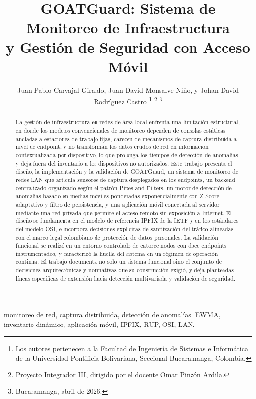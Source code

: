 \documentclass[journal]{IEEEtran}
\title{GOATGuard: Sistema de Monitoreo de Infraestructura \\
       y Gestión de Seguridad con Acceso Móvil}
\author{Juan Pablo Carvajal Giraldo,
        Juan David Monsalve Niño,
        y Johan David Rodríguez Castro
\thanks{Los autores pertenecen a la Facultad de Ingeniería de Sistemas 
e Informática de la Universidad Pontificia Bolivariana, Seccional 
Bucaramanga, Colombia.}
\thanks{Proyecto Integrador III, dirigido por el docente Omar Pinzón Ardila.}
\thanks{Bucaramanga, abril de 2026.}}
\begin{document}
\maketitle

\begin{abstract}
La gestión de infraestructura en redes de área local enfrenta una 
limitación estructural, en donde los modelos convencionales de monitoreo 
dependen de consolas estáticas ancladas a estaciones de trabajo 
fijas, carecen de mecanismos de captura distribuida a nivel de 
endpoint, y no transforman los datos crudos de red en información 
contextualizada por dispositivo, lo que prolonga los tiempos de 
detección de anomalías y deja fuera del inventario a los 
dispositivos no autorizados. Este trabajo presenta el diseño, la 
implementación y la validación de GOATGuard, un sistema de 
monitoreo de redes LAN que articula sensores de captura 
desplegados en los endpoints, un backend centralizado organizado 
según el patrón Pipes and Filters, un motor de detección de 
anomalías basado en medias móviles ponderadas exponencialmente con 
Z-Score adaptativo y filtro de persistencia, y una aplicación 
móvil conectada al servidor mediante una red privada que permite 
el acceso remoto sin exposición a Internet. El diseño se fundamenta 
en el modelo de referencia IPFIX de la IETF y en los estándares del 
modelo OSI, e incorpora decisiones explícitas de sanitización del 
tráfico alineadas con el marco legal colombiano de protección de 
datos personales. La validación funcional se realizó en un entorno 
controlado de catorce nodos con doce endpoints instrumentados, y 
caracterizó la huella del sistema en un régimen de operación 
continua. El trabajo documenta no solo un sistema funcional sino el 
conjunto de decisiones arquitectónicas y normativas que su 
construcción exigió, y deja planteadas líneas específicas de 
extensión hacia detección multivariada y validación de seguridad.
\end{abstract}


\begin{IEEEkeywords}
monitoreo de red, captura distribuida, detección de anomalías,
EWMA, inventario dinámico, aplicación móvil, IPFIX, RUP, OSI, LAN.
\end{IEEEkeywords}

\IEEEpeerreviewmaketitle
















\appendices


\end{document}
